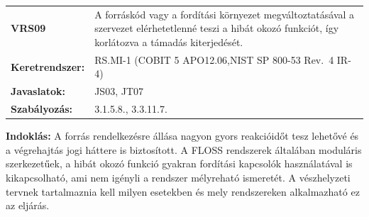 \documentclass[12pt,magyar,a4paper,oneside]{scrreprt}
\begin{document}
\begin{longtable}[]{@{}ll@{}}
\toprule
\endhead
\begin{minipage}[t]{0.16\columnwidth}\raggedright
\textbf{VRS09}\strut
\end{minipage} & \begin{minipage}[t]{0.79\columnwidth}\raggedright
A forráskód vagy a fordítási környezet megváltoztatásával a szervezet
elérhetetlenné teszi a hibát okozó funkciót, így korlátozva a támadás
kiterjedését.\strut
\end{minipage}\tabularnewline
\begin{minipage}[t]{0.16\columnwidth}\raggedright
\textbf{Keretrendszer:}\strut
\end{minipage} & \begin{minipage}[t]{0.79\columnwidth}\raggedright
RS.MI-1 (COBIT 5 APO12.06,NIST SP 800-53 Rev.~4 IR-4)\strut
\end{minipage}\tabularnewline
\begin{minipage}[t]{0.16\columnwidth}\raggedright
\textbf{Javaslatok:}\strut
\end{minipage} & \begin{minipage}[t]{0.79\columnwidth}\raggedright
JS03, JT07\strut
\end{minipage}\tabularnewline
\begin{minipage}[t]{0.16\columnwidth}\raggedright
\textbf{Szabályozás:}\strut
\end{minipage} & \begin{minipage}[t]{0.79\columnwidth}\raggedright
3.1.5.8., 3.3.11.7.\strut
\end{minipage}\tabularnewline
\bottomrule
\end{longtable}

\textbf{Indoklás: } A forrás rendelkezésre állása nagyon gyors
reakcióidőt tesz lehetővé és a végrehajtás jogi háttere is biztosított.
A FLOSS rendszerek általában moduláris szerkezetűek, a hibát okozó
funkció gyakran fordítási kapcsolók használatával is kikapcsolható, ami
nem igényli a rendszer mélyreható ismeretét. A vészhelyzeti tervnek
tartalmaznia kell milyen esetekben és mely rendszereken alkalmazható ez
az eljárás.
\end{document}
